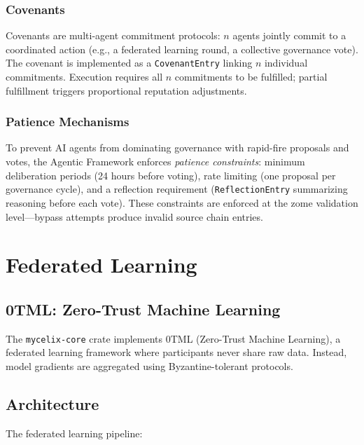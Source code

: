 \documentclass[12pt]{book}
\begin{document}
\subsection{Covenants}

Covenants are multi-agent commitment protocols: $n$ agents jointly
commit to a coordinated action (e.g., a federated learning round,
a collective governance vote).  The covenant is implemented as a
\texttt{CovenantEntry} linking $n$ individual commitments.  Execution
requires all $n$ commitments to be fulfilled; partial fulfillment
triggers proportional reputation adjustments.

\subsection{Patience Mechanisms}

To prevent AI agents from dominating governance with rapid-fire
proposals and votes, the Agentic Framework enforces \emph{patience
constraints}: minimum deliberation periods (24 hours before voting),
rate limiting (one proposal per governance cycle), and a reflection
requirement (\texttt{ReflectionEntry} summarizing reasoning before
each vote).  These constraints are enforced at the zome validation
level---bypass attempts produce invalid source chain entries.


\chapter{Federated Learning}
\label{ch:fl}

\section{0TML: Zero-Trust Machine Learning}

The \texttt{mycelix-core} crate implements 0TML (Zero-Trust Machine Learning),
a federated learning framework where participants never share raw data.
Instead, model gradients are aggregated using Byzantine-tolerant protocols.

\section{Architecture}

The federated learning pipeline:
\end{document}
